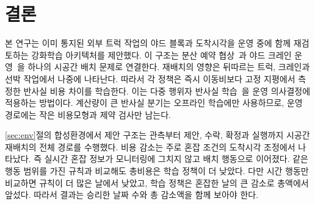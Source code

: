 \section{결론}
\label{sec:concl}

본 연구는 이미 통지된 외부 트럭 작업의 야드 블록과 도착시각을 운영 중에 함께
재검토하는 강화학습 아키텍처를 제안했다. 이 구조는 분산 예약 협상~\cite{ref6}과 야드
크레인 운영~\cite{ref7,ref8}을 하나의 시공간 배치 문제로 연결한다. 재배치의 영향은
뒤따르는 트럭, 크레인과 선박 작업에서 나중에 나타난다. 따라서 각 정책은 즉시
이동비보다 고정 지평에서 측정한 반사실 비용 차이를 학습한다. 이는 다중 행위자 반사실
학습~\cite{ref10,ref11}을 운영 의사결정에 적용하는 방법이다. 계산량이 큰 반사실 분기는
오프라인 학습에만 사용하므로, 운영 경로에는 작은 비용모형과 제약 검사만 남는다.

\ref{sec:env}절의 합성환경에서 제안 구조는 관측부터 제안, 수락, 확정과 실행까지 시공간
재배치의 전체 경로를 수행했다. 비용 감소는 주로 혼잡 조건의 도착시각 조정에서
나타났다. 즉 실시간 혼잡 정보가 모니터링에 그치지 않고 배치 행동으로 이어졌다. 같은 행동 범위를 가진 규칙과 비교해도 총비용은
학습 정책이 더 낮았다. 다만 시간 행동만 비교하면 규칙이 더 많은 날에서 낮았고, 학습
정책은 혼잡한 날의 큰 감소로 총액에서 앞섰다. 따라서 결과는 승리한 날짜 수와 총
감소액을 함께 보아야 한다.

